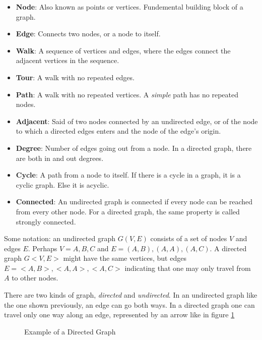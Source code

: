 \begin{itemize}
    \item \textbf{Node}: Also known as points or vertices. Fundemental
          building block of a graph.
    \item \textbf{Edge}: Connects two nodes, or a node to itself.
    \item \textbf{Walk}: A sequence of vertices and edges, where the edges connect the adjacent vertices in the sequence.
    \item \textbf{Tour}: A walk with no repeated edges.
    \item \textbf{Path}: A walk with no repeated vertices. A \emph{simple} path has no repeated nodes.
    \item \textbf{Adjacent}: Said of two nodes connected by an undirected edge,
          or of the node to which a directed edges enters and the node of the edge's origin.
    \item \textbf{Degree}: Number of edges going out from a node. In a directed graph,
          there are both in and out degrees.
    \item \textbf{Cycle}: A path from a node to itself. If there is a cycle in a
          graph, it is a cyclic graph. Else it is acyclic.
    \item \textbf{Connected}: An undirected graph is connected if every node can be reached
          from every other node. For a directed graph, the same property is called strongly connected.
\end{itemize}

Some notation: an undirected graph $G(V,E)$ consists of a set of nodes $V$
and edges $E$. Perhaps $V = {A, B, C}$ and $E = {(A,B), (A,A), (A, C)}$.
A directed graph $G<V, E>$ might have the same vertices, but edges
$E = {<A,B>, <A,A>, <A, C>}$ indicating that one may only travel from $A$
to other nodes.

There are two kinds of graph, \emph{directed} and \emph{undirected}.
In an undirected graph like the one shown previously, an edge can
go both ways. In a directed graph one can travel only one way along an
edge, represented by an arrow like in figure \ref{fig:directedgraph}

\begin{figure}
    \caption{Example of a Directed Graph}
    \label{fig:directedgraph}
\end{figure}


